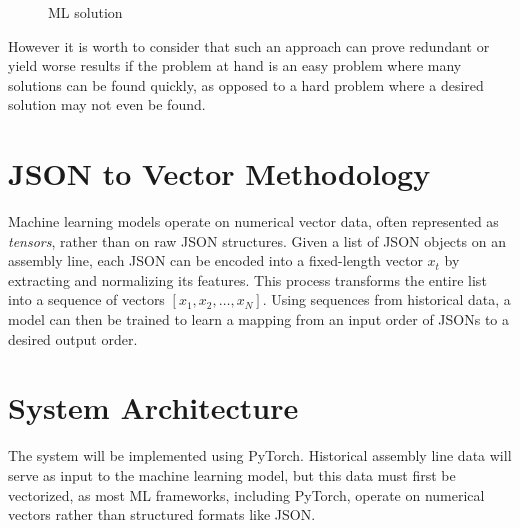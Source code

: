\documentclass[12pt,a4paper]{report}
\begin{document}
\begin{figure}[ht]
    \centering
    \caption{ML solution}
    \label{fig:ml_solution}
\end{figure}

However it is worth to consider that such an approach can prove redundant or yield worse results if the problem at hand is an easy problem where many solutions can be found quickly, as opposed to a hard problem where a desired solution may not even be found. 

\section{JSON to Vector Methodology}
Machine learning models operate on numerical vector data, often represented as \textit{tensors}, rather than on raw JSON structures. Given a list of JSON objects on an assembly line, each JSON can be encoded into a fixed-length vector $x_t$ by extracting and normalizing its features. This process transforms the entire list into a sequence of vectors ${[x_1, x_2, \dots, x_N]}$. Using sequences from historical data, a model can then be trained to learn a mapping from an input order of JSONs to a desired output order.

\section{System Architecture}

The system will be implemented using PyTorch. Historical assembly line data will serve as input to the machine learning model, but this data must first be vectorized, as most ML frameworks, including PyTorch, operate on numerical vectors rather than structured formats like JSON.
\end{document}
